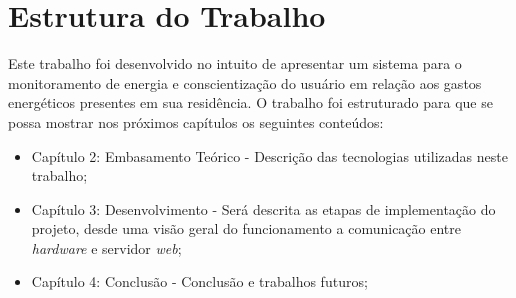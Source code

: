 \section{Estrutura do Trabalho}
Este trabalho foi desenvolvido no intuito de apresentar um sistema para o monitoramento de energia e conscientização do usuário em relação aos 
gastos energéticos presentes em sua residência. O trabalho foi estruturado para que se possa mostrar nos próximos capítulos os seguintes conteúdos:
\begin{itemize}
	\item Capítulo 2: Embasamento Teórico - Descrição das tecnologias utilizadas neste trabalho;
	\item Capítulo 3: Desenvolvimento - Será descrita as etapas de implementação do projeto, desde uma visão geral do funcionamento a comunicação entre \textit{hardware} e servidor \textit{web};
	\item Capítulo 4: Conclusão - Conclusão e trabalhos futuros;
\end{itemize}